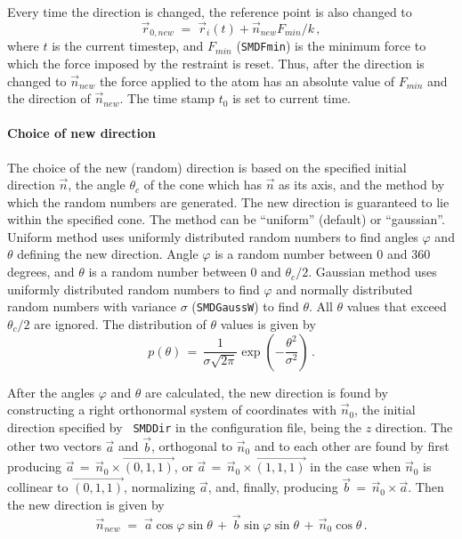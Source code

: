 Every time the direction is changed, the reference point is also
changed to
\begin{equation}
  \vec r_{0,new} \; = \; \vec r_i(t) + \vec n_{new} F_{min}/k \, ,
\label{eq:smdreset}
\end{equation}
where $t$ is the current timestep, and $F_{min}$ ({\tt SMDFmin}) is
the minimum force to which the force imposed by the restraint is
reset. Thus, after the direction is changed to $\vec n_{new}$ the
force applied to the atom has an absolute value of $F_{min}$ and the
direction of $\vec n_{new}$. The time stamp $t_0$ is set to current
time.


\paragraph*{Choice of new direction}
The choice of the new (random) direction is based on the specified
initial direction $\vec n$, the angle $\theta_c$ of the cone which has
$\vec n$ as its axis, and the method by which the random numbers are
generated.  The new direction is guaranteed to lie within the
specified cone. The method can be ``uniform'' (default) or
``gaussian''. Uniform method uses uniformly distributed random numbers
to find angles $\varphi$ and $\theta$ defining the new
direction. Angle $\varphi$ is a random number between 0 and 360
degrees, and $\theta$ is a random number between 0 and
$\theta_c/2$. Gaussian method uses uniformly distributed random
numbers to find $\varphi$ and normally distributed random numbers with
variance $\sigma$ ({\tt SMDGaussW}) to find $\theta$. All $\theta$
values that exceed $\theta_c/2$ are ignored. The distribution of
$\theta$ values is given by 
\begin{equation}
p(\theta) \, = \, \frac{1}{\sigma \sqrt{2\pi}} 
\exp(- \frac{\theta^2}{\sigma^2}) \, .
\end{equation}

After the angles $\varphi$ and $\theta$ are calculated, the new
direction is found by constructing a right orthonormal system of
coordinates with $\vec n_0$, the initial direction specified by {\tt
SMDDir} in the configuration file, being the $z$ direction.  The
other two vectors $\vec a$ and $\vec b$, orthogonal to $\vec n_0$ and
to each other are found by first producing $\vec a \, = \, \vec n_0
\times
\vec{(0, 1, 1)}$, or $\vec a \, = \, \vec n_0 \times 
\vec{(1, 1, 1)}$ in the case when $\vec n_0$ is collinear to 
$\vec{(0, 1, 1)}$, normalizing $\vec a$, and, finally, producing 
$\vec b \, = \, \vec n_0 \times \vec a$. Then the new direction is
given by 
\begin{equation}
\vec n_{new} \; = \; \vec a \cos\varphi \sin\theta \, + \,
	\vec b \sin\varphi \sin\theta \, + \,
	\vec n_0 \cos\theta \, .
\end{equation}


